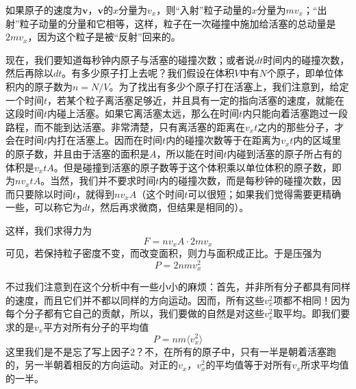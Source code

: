 如果原子的速度为$\boldsymbol{v}$，$\boldsymbol{v}$的$x$分量为$v_x$，则“入射”粒子动量的$x$分量为$mv_x$；“出射”粒子动量的分量和它相等，这样，粒子在一次碰撞中施加给活塞的总动量是$2mv_x$，因为这个粒子是被“反射”回来的。

现在，我们要知道每秒钟内原子与活塞的碰撞次数；或者说$dt$时间内的碰撞次数，然后再除以$dt$。有多少原子打上去呢？我们假设在体积$V$中有$N$个原子，即单位体积内的原子数为$n=N/V$。为了找出有多少个原子打在活塞上，我们注意到，给定一个时间$t$，若某个粒子离活塞足够近，并且具有一定的指向活塞的速度，就能在这段时间$t$内碰上活塞。如果它离活塞太远，那么在时间$t$内只能向着活塞跑过一段路程，而不能到达活塞。非常清楚，只有离活塞的距离在$v_xt$之内的那些分子，才会在时间$t$内打在活塞上。因而在时间$t$内的碰撞次数等于在距离为$v_xt$内的区域里的原子数，并且由于活塞的面积是$A$，所以能在时间$t$内碰到活塞的原子所占有的体积是$v_xtA$。但是碰撞到活塞的原子数等于这个体积乘以单位体积的原子数，即为$nv_xtA$。当然，我们并不要求时间$t$内的碰撞次数，而是每秒钟的碰撞次数，因而只要除以时间$t$，就得到$nv_xA$（这个时间$t$可以很短；如果我们觉得需要更精确一些，可以称它为$dt$，然后再求微商，但结果是相同的）。

这样，我们求得力为
\begin{equation}
    \label{Eq:I:39:3}
    F=nv_xA\cdot 2mv_x
\end{equation}
可见，若保持粒子密度不变，而改变面积，则力与面积成正比。于是压强为
\begin{equation}
    \label{Eq:I:39:4}
    P = 2nmv_x^2
\end{equation}

不过我们注意到在这个分析中有一些小小的麻烦：首先，并非所有分子都具有同样的速度，而且它们并不都以同样的方向运动。因而，所有这些$v_x^2$项都不相同！因为每个分子都有它自己的贡献，所以，我们要做的自然是对这些$v_x^2$取平均。即我们要求的是$v_x$平方对所有分子的平均值
\begin{equation}
    \label{Eq:I:39:5}
    P = nm\langle v_x^2 \rangle
\end{equation}
这里我们是不是忘了写上因子$2$？不，在所有的原子中，只有一半是朝着活塞跑的，另一半朝着相反的方向运动。对正的$v_x$，$v_x^2$的平均值等于对所有$v_x$所求平均值的一半。

